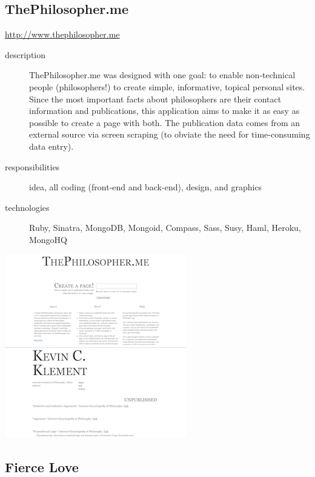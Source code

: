 \documentclass{article}
\begin{document}
\subsection{ThePhilosopher.me} %
\label{sub:ThePhilosopher}

\href{http://www.thephilosopher.me}{http://www.thephilosopher.me}

\begin{description}
  \item[description] ThePhilosopher.me was designed with one goal: to 
    enable non-technical people (philosophers!) to create simple, 
    informative, topical personal sites.  Since the most important 
    facts about philosophers are their contact information and 
    publications, this application aims to make it as easy as possible 
    to create a page with both.  The publication data comes from an 
    external source via screen scraping (to obviate the need for 
    time-consuming data entry).
  \item[responsibilities] idea, all coding (front-end and back-end), 
    design, and graphics
  \item[technologies] Ruby, Sinatra, MongoDB, Mongoid, Compass, Sass, 
    Susy, Haml, Heroku, MongoHQ
\end{description}

\includegraphics[scale=.5]{../source/images/portfolio/philosopher.me-home-sm.png}
\includegraphics[scale=.5]{../source/images/portfolio/philosopher.me-sample-sm.png}

\subsection{Fierce Love} %
\label{sub:Fierce Love}
\end{document}
